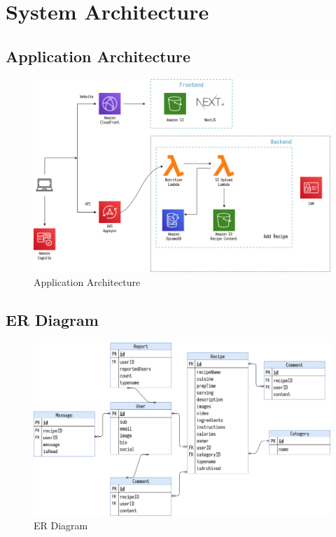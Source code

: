 %
%
\chapter{System Architecture}%
%
\label{chapter:system_architecture}

\section{Application Architecture}

\begin{figure}[!hb]
\centering
\caption[Application Architecture]{Application Architecture}%
\label{fig:application_architecture}
\includegraphics[width=\linewidth,height=\textheight,keepaspectratio]{img/application_architecture}
\end{figure}

\clearpage

\section{ER Diagram}

\begin{figure}[!hb]
\centering
\caption[ER Diagram]{ER Diagram}%
\label{fig:erd}
\includegraphics[width=\linewidth,height=\textheight,keepaspectratio]{img/erd}
\end{figure}


